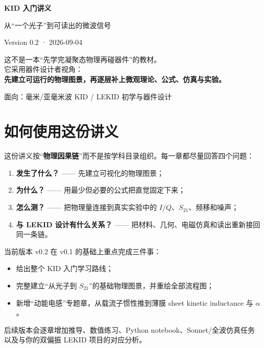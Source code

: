 \documentclass[11pt,a4paper,openany]{ctexrep}
\newcommand{\Stwentyone}{S_{21}}
\begin{document}
\begin{titlepage}
\centering
\vspace*{2.2cm}
{\fontsize{30}{38}\selectfont\bfseries\color{KidDark} KID 入门讲义}\par
\vspace{0.5cm}
{\Large\color{KidBlue} 从“一个光子”到可读出的微波信号}\par
\vspace{1.4cm}
{\large Version 0.2 · 2026-09-04}\par
\vfill
\begin{tcolorbox}[width=0.88\textwidth,colback=KidGray,colframe=KidBlue!55,arc=3mm]
\centering
\large
这不是一本“先学完凝聚态物理再碰器件”的教材。\\[0.5em]
它采用器件设计者视角：\\[0.3em]
\textbf{先建立可运行的物理图景，再逐层补上微观理论、公式、仿真与实验。}
\end{tcolorbox}
\vfill
{\large 面向：毫米/亚毫米波 KID / LEKID 初学与器件设计}\par
\end{titlepage}

\tableofcontents
\clearpage

\chapter*{如何使用这份讲义}
这份讲义按“\textbf{物理因果链}”而不是按学科目录组织。每一章都尽量回答四个问题：
\begin{enumerate}
  \item \textbf{发生了什么？} —— 先建立可视化的物理图景；
  \item \textbf{为什么？} —— 用最少但必要的公式把直觉固定下来；
  \item \textbf{怎么测？} —— 把物理量连接到真实实验中的 $I/Q$、$\Stwentyone$、频移和噪声；
  \item \textbf{与 LEKID 设计有什么关系？} —— 把材料、几何、电磁仿真和读出重新接回同一条链。
\end{enumerate}

当前版本 v0.2 在 v0.1 的基础上重点完成三件事：
\begin{itemize}
  \item 给出整个 KID 入门学习路线；
  \item 完整建立“从光子到 $\Stwentyone$”的基础物理图景，并重绘全部流程图；
  \item 新增“动能电感”专题章，从载流子惯性推到薄膜 sheet kinetic inductance 与 $\alpha$。
\end{itemize}
后续版本会逐章增加推导、数值练习、Python notebook、Sonnet/全波仿真任务以及与你的双偏振 LEKID 项目的对应分析。
\end{document}
